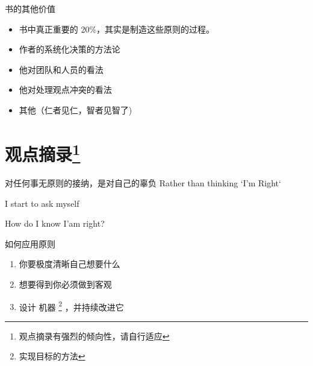 \documentclass[presentation, bigger]{beamer}
\begin{document}
\begin{frame}[label={sec:org8e131ac}]{书的其他价值}
\begin{itemize}
\item 书中真正重要的 20\%，其实是制造这些原则的过程。
\item 作者的系统化决策的方法论
\item 他对团队和人员的看法
\item 他对处理观点冲突的看法
\item 其他（仁者见仁，智者见智了)
\end{itemize}
\end{frame}

\section{观点摘录\footnote{观点摘录有强烈的倾向性，请自行适应}}
\label{sec:org6dff31c}
\begin{frame}[label={sec:orged6fe44}]{对任何事无原则的接纳，是对自己的辜负}
Rather than thinking `I'm Right`

I start to ask myself

\alert{How do I know I'am right?}
\end{frame}

\begin{frame}[label={sec:org17978eb}]{如何应用原则}
\begin{enumerate}
\item 你要极度清晰自己想要什么
\item 想要得到你必须做到客观
\item 设计 \alert{机器} \footnote{实现目标的方法} ，并持续改进它
\end{enumerate}
\end{frame}
\end{document}
